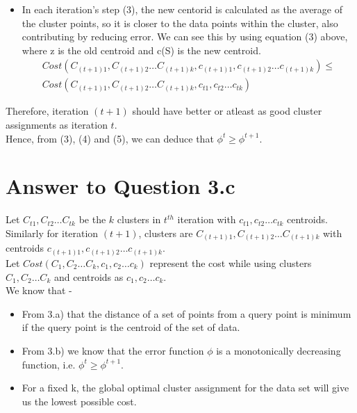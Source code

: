 \documentclass[11pt]{article}
\begin{document}
{\begin{itemize}
\item In each iteration's step (3), the new centorid is calculated as the average of the cluster points, so it is closer to the data points within the cluster, also contributing by reducing error. We can see this by using equation (3) above, where z is the old centroid and c(S) is the new centroid.\\
\begin{equation}\label{eq:simple}
\begin{aligned}
Cost (C_{(t+1)1}, C_{(t+1)2} \hdots C_{(t+1)k}, c_{(t+1)1}, c_{(t+1)2} \hdots c_{(t+1)k}) \leq \\
Cost (C_{(t+1)1}, C_{(t+1)2} \hdots C_{(t+1)k}, c_{t1}, c_{t2} \hdots c_{tk})
\end{aligned}
\end{equation}

\end{itemize}

Therefore, iteration $(t+1)$ should have better or atleast as good cluster assignments as iteration $t$. \\

Hence, from (3), (4) and (5), we can deduce that $\phi^t \geq \phi^{t+1}$.


\pagebreak[4]
\section*{Answer to Question 3.c}
\setcounter{equation}{0}
Let $C_{t1}, C_{t2} \hdots C_{tk}$ be the $k$ clusters in $t^{th}$ iteration with $c_{t1}, c_{t2} \hdots c_{tk}$ centroids. Similarly for iteration $(t+1)$, clusters are $C_{(t+1)1}, C_{(t+1)2} \hdots C_{(t+1)k}$ with centroids $c_{(t+1)1}, c_{(t+1)2} \hdots c_{(t+1)k}$. \\

Let $Cost (C_1, C_2 \hdots C_k, c_1, c_2 \hdots c_k)$ represent the cost while using clusters $C_1, C_2 \hdots C_k$ and centroids as $c_1, c_2 \hdots c_k$.\\

We know that -
\begin{itemize}
\item From 3.a) that the distance of a set of points from a query point is minimum if the query point is the centroid of the set of data.
\item From 3.b) we know that the error function $\phi$ is a monotonically decreasing function, i.e. $\phi^t \geq \phi^{t+1}$.
\item For a fixed k, the global optimal cluster assignment for the data set will give us the lowest possible cost. 
\end{itemize}

}
\end{document}
